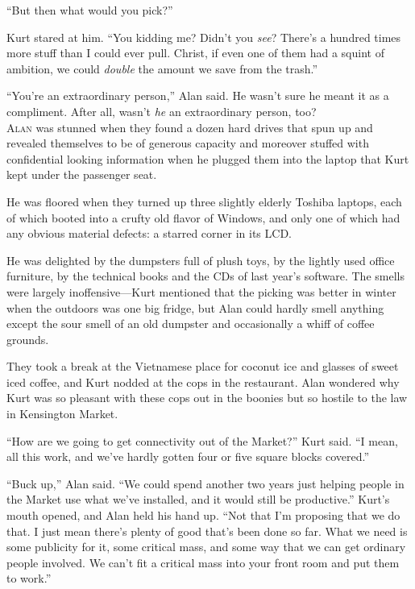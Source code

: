 \documentclass{article}
\begin{document}
``But then what would you pick?''

Kurt stared at him.  ``You kidding me?  Didn't you \textit{see}? 
There's a hundred times more stuff than I could ever pull.  Christ, if
even one of them had a squint of ambition, we could \textit{double}
the amount we save from the trash.''

``You're an extraordinary person,'' Alan said.  He wasn't sure he
meant it as a compliment.  After all, wasn't \textit{he} an
extraordinary person, too?
\\
\lettrine[lines=3, lhang=.5, nindent=0pt, findent=2pt]{A}{lan} was stunned when they found a dozen hard drives that spun up and
revealed themselves to be of generous capacity and moreover stuffed
with confidential looking information when he plugged them into the
laptop that Kurt kept under the passenger seat.

He was floored when they turned up three slightly elderly Toshiba
laptops, each of which booted into a crufty old flavor of Windows, and
only one of which had any obvious material defects:  a starred corner
in its LCD.

He was delighted by the dumpsters full of plush toys, by the lightly
used office furniture, by the technical books and the CDs of last
year's software.  The smells were largely inoffensive---Kurt mentioned
that the picking was better in winter when the outdoors was one big
fridge, but Alan could hardly smell anything except the sour smell of
an old dumpster and occasionally a whiff of coffee grounds.

They took a break at the Vietnamese place for coconut ice and glasses
of sweet iced coffee, and Kurt nodded at the cops in the restaurant. 
Alan wondered why Kurt was so pleasant with these cops out in the
boonies but so hostile to the law in Kensington Market.

``How are we going to get connectivity out of the Market?'' Kurt said. 
``I mean, all this work, and we've hardly gotten four or five square
blocks covered.''

``Buck up,'' Alan said.  ``We could spend another two years just
helping people in the Market use what we've installed, and it would
still be productive.'' Kurt's mouth opened, and Alan held his hand up. 
``Not that I'm proposing that we do that.  I just mean there's plenty
of good that's been done so far.  What we need is some publicity for
it, some critical mass, and some way that we can get ordinary people
involved.  We can't fit a critical mass into your front room and put
them to work.''
\end{document}
